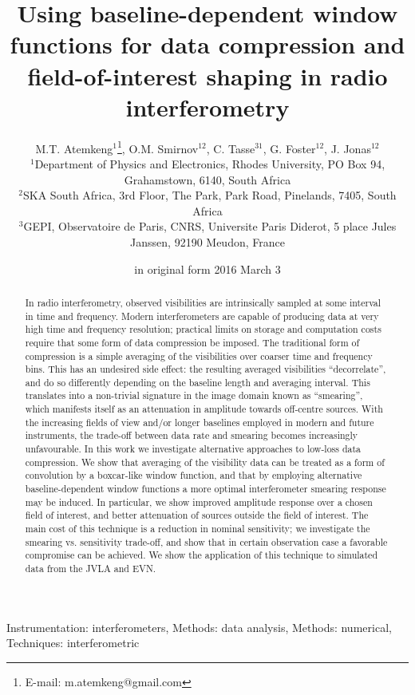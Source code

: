 \documentclass[useAMS,usenatbib]{mn2e}
\title[BDWFs for data compression and FoI shaping]{Using baseline-dependent window functions 
for data compression and field-of-interest shaping in radio interferometry}
\author[M.T. Atemkeng, O.M. Smirnov, C. Tasse, G. Foster and J. Jonas]{M.T. 
Atemkeng$^{1}$\thanks{E-mail: m.atemkeng@gmail.com}, O.M. Smirnov$^{12}$, C. Tasse$^{31}$, G. Foster$^{12}$, J. Jonas$^{12}$ \\
$^1$Department of Physics and Electronics, Rhodes University, PO Box 94, Grahamstown, 6140, South Africa\\
$^2$SKA South Africa, 3rd Floor, The Park, Park Road, Pinelands, 7405, South Africa\\
$^3$GEPI, Observatoire de Paris, CNRS, Universite Paris Diderot, 5 place Jules Janssen, 92190 Meudon, France}
\begin{document}
\date{in original form 2016 March 3}

\pagerange{\pageref{firstpage}--\pageref{lastpage}} 

\maketitle

\label{firstpage}

\begin{abstract}


In radio interferometry, observed visibilities are intrinsically sampled at some interval in time and frequency. 
Modern interferometers are capable of producing data at very high time and frequency resolution; practical 
limits on storage and computation costs require that some form of data compression be imposed. The 
traditional form of compression is a simple averaging of the visibilities over coarser time and frequency bins. This
has an undesired side effect: the resulting averaged visibilities ``decorrelate'', and do so differently depending 
on the baseline length and averaging interval. This translates into a non-trivial signature in the image domain 
known as ``smearing'', which manifests itself as an attenuation in amplitude towards off-centre sources. 
With the increasing fields of view and/or longer baselines employed in modern and future instruments, the trade-off between
data rate and smearing becomes increasingly unfavourable. In this work we investigate alternative approaches to low-loss data
compression. We show that averaging of the visibility data 
can be treated as a form of convolution by a boxcar-like window function, and that by employing alternative 
baseline-dependent window functions a more optimal interferometer smearing response may be induced. In particular, 
we show improved amplitude response over a chosen field of interest, and better attenuation of sources outside the field of interest. The main cost of this technique is a reduction in nominal sensitivity; we investigate the smearing vs. 
sensitivity trade-off, and show that in certain observation case a favorable 
compromise can be achieved. We show the application of this technique to simulated data from the JVLA and EVN.
\end{abstract}
\begin{keywords}
Instrumentation: interferometers, Methods: data analysis, Methods: numerical, Techniques: interferometric
\end{keywords}
\end{document}
